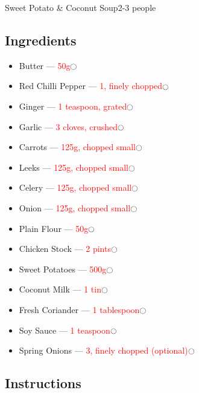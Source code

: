 \documentclass[12pt]{article}%
\newcommand{\tick}{\dotfill\(\ocircle\)}
\newcommand{\blue}[1]{\textcolor{blue!70!white}{#1}}
\newcommand{\red}[1]{\textcolor{red}{#1}}
\newcommand{\green}[1]{\textcolor{green!70!black}{#1}}
\newcommand{\quant}[1]{\red{#1}\tick}
\begin{document}

{\LARGE \blue{Sweet Potato \& Coconut Soup}\hfill\normalsize 2-3 people}

\vspace{-\baselineskip}\hrulefill


\subsection*{Ingredients}

\begin{itemize}[nolistsep]
    \item Butter --- \quant{50g}
    \item Red Chilli Pepper --- \quant{1, finely chopped}
    \item Ginger --- \quant{1 teaspoon, grated}
    \item Garlic --- \quant{3 cloves, crushed}
    \item Carrots --- \quant{125g, chopped small}
    \item Leeks --- \quant{125g, chopped small}
    \item Celery --- \quant{125g, chopped small}
    \item Onion --- \quant{125g, chopped small}
    \item Plain Flour --- \quant{50g}
    \item Chicken Stock --- \quant{2 pints}
    \item Sweet Potatoes --- \quant{500g}
    \item Coconut Milk --- \quant{1 tin}
    \item Fresh Coriander --- \quant{1 tablespoon}
    \item Soy Sauce --- \quant{1 teaspoon}
    \item Spring Onions --- \quant{3, finely chopped (optional)}
\end{itemize}

\subsection*{Instructions}
\end{document}
